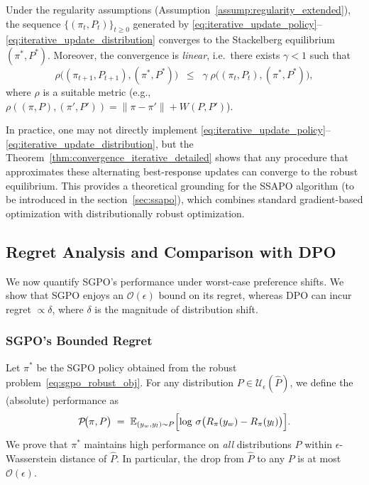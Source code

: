 \begin{theorem}
\label{thm:convergence_iterative_detailed}
Under the regularity assumptions (Assumption~\ref{assump:regularity_extended}), the sequence $\{(\pi_t,P_t)\}_{t \ge 0}$ generated by \eqref{eq:iterative_update_policy}--\eqref{eq:iterative_update_distribution} converges to the Stackelberg equilibrium $(\pi^*,P^*)$.  Moreover, the convergence is \emph{linear}, i.e.\ there exists $\gamma < 1$ such that 
$$
\rho\bigl((\pi_{t+1},P_{t+1}),(\pi^*,P^*)\bigr)
\;\;\le\;\;
\gamma
\;\rho\bigl((\pi_t,P_t),(\pi^*,P^*)\bigr),
$$
where $\rho$ is a suitable metric (e.g., \ $\rho((\pi,P),(\pi',P'))=\|\pi-\pi'\|+ W(P,P')$).
\end{theorem}

In practice, one may not directly implement \eqref{eq:iterative_update_policy}--\eqref{eq:iterative_update_distribution}, but the Theorem~\ref{thm:convergence_iterative_detailed} shows that any procedure that approximates these alternating best-response updates can converge to the robust equilibrium.  This provides a theoretical grounding for the SSAPO algorithm (to be introduced in the section~\ref{sec:ssapo}), which combines standard gradient-based optimization with distributionally robust optimization.

\subsection{Regret Analysis and Comparison with DPO}
\label{sec:regret}
We now quantify SGPO’s performance under worst-case preference shifts.  We show that SGPO enjoys an $\mathcal{O}(\epsilon)$ bound on its regret, whereas DPO can incur regret $\propto \delta$, where $\delta$ is the magnitude of distribution shift.

\subsubsection{SGPO’s Bounded Regret}
Let $\pi^*$ be the SGPO policy obtained from the robust problem~\eqref{eq:sgpo_robust_obj}.  For any distribution $P\in\mathcal{U}_\epsilon(\hat{P})$, we define the (absolute) performance as
\begin{equation}
\mathcal{P}\!\bigl(\pi, P\bigr)
\;=\;
\mathbb{E}_{(y_w,y_l)\sim P}
\Bigl[
  \log\,\sigma\bigl(R_{\pi}(y_w)-R_{\pi}(y_l)\bigr)
\Bigr].
\end{equation}
We prove that $\pi^*$ maintains high performance on \emph{all} distributions $P$ within $\epsilon$-Wasserstein distance of $\hat{P}$.  In particular, the drop from $\hat{P}$ to any $P$ is at most $\mathcal{O}(\epsilon)$.

